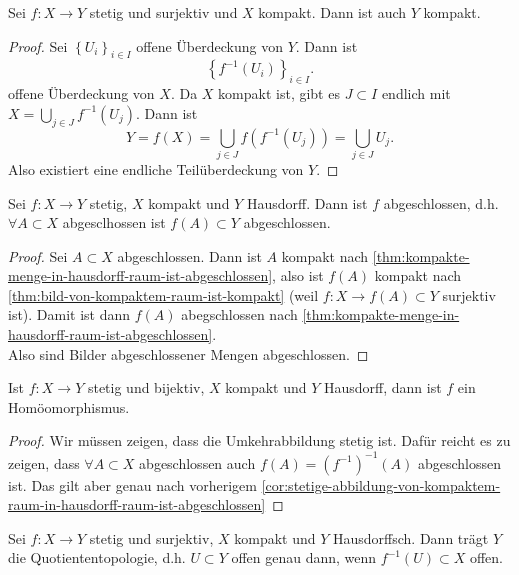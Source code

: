\begin{theorem}\label{thm:bild-von-kompaktem-raum-ist-kompakt}
    Sei $f: X \to  Y$ stetig und surjektiv und $X$ kompakt. Dann ist auch  $Y$ kompakt. 
\end{theorem}
\begin{proof}
    Sei $\left \{U_i\right\} _{i \in I}$ offene Überdeckung von $Y$. Dann ist
     \[
         \left \{f^{-1}(U_i)\right\} _{i \in I}
    .\] 
    offene Überdeckung von $X$. Da  $X$ kompakt ist, gibt es  $J\subset I$ endlich mit $X = \bigcup_{j\in J} f^{-1}(U_j)$. Dann ist 
    \[
        Y = f(X) = \bigcup_{j\in J} f(f^{-1}(U_j)) = \bigcup_{j\in J} U_j
    .\] 
    Also existiert eine endliche Teilüberdeckung von $Y$.
\end{proof}
\begin{corollary}\label{cor:stetige-abbildung-von-kompaktem-raum-in-hausdorff-raum-ist-abgeschlossen}
    Sei $f: X \to  Y$ stetig, $X$ kompakt und  $Y$ Hausdorff. Dann ist  $f$ abgeschlossen, d.h. $\forall A\subset X$ abgesclhossen ist $f(A) \subset Y$ abgeschlossen.
\end{corollary}
\begin{proof}
    Sei $A\subset X$ abgeschlossen. Dann ist $A$ kompakt nach \autoref{thm:kompakte-menge-in-hausdorff-raum-ist-abgeschlossen}, also ist  $f(A)$ kompakt nach \autoref{thm:bild-von-kompaktem-raum-ist-kompakt} (weil $f: X \to f(A)\subset Y$ surjektiv ist). Damit ist dann $f(A)$ abegschlossen nach \autoref{thm:kompakte-menge-in-hausdorff-raum-ist-abgeschlossen}. \\
    Also sind Bilder abgeschlossener Mengen abgeschlossen.
\end{proof}

\begin{corollary}[Homöomorphismen]\label{cor:stetige-bijektion-von-kompaktem-raum-in-hausdorff-raum-ist-homöomorphismus}
    Ist $f: X \to  Y$ stetig und bijektiv, $X$ kompakt und  $Y$ Hausdorff, dann ist  $f$ ein Homöomorphismus.
\end{corollary}

\begin{proof}
    Wir müssen zeigen, dass die Umkehrabbildung stetig ist. Dafür reicht es zu zeigen, dass $\forall A\subset X$ abgeschlossen auch $f(A) = (f^{-1})^{-1}(A)$ abgeschlossen ist. Das gilt aber genau nach vorherigem \autoref{cor:stetige-abbildung-von-kompaktem-raum-in-hausdorff-raum-ist-abgeschlossen}
\end{proof}
\begin{corollary}\label{cor:abbildung-von-kompaktem-raum-in-hausdorff-raum-ist-quotientenabbildung}
    Sei $f: X \to  Y$ stetig und surjektiv, $X$ kompakt und  $Y$ Hausdorffsch. Dann trägt  $Y$ die Quotiententopologie, d.h.  $U\subset Y$ offen genau dann, wenn $f^{-1}(U) \subset X$ offen.
\end{corollary}


